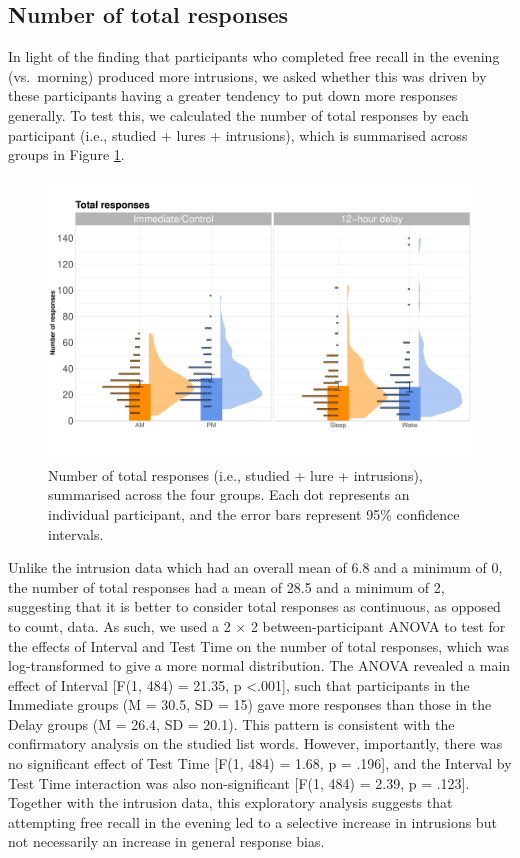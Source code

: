 \documentclass[
]{article}
\begin{document}
\hypertarget{number-of-total-responses}{%
\subsection{Number of total responses}\label{number-of-total-responses}}

In light of the finding that participants who completed free recall in the evening (vs.~morning) produced more intrusions, we asked whether this was driven by these participants having a greater tendency to put down more responses generally. To test this, we calculated the number of total responses by each participant (i.e., studied + lures + intrusions), which is summarised across groups in Figure \ref{fig:totalfig}.

\begin{figure}

{\centering \includegraphics{Figures/totalgraph} 

}

\caption{Number of total responses (i.e., studied + lure + intrusions), summarised across the four groups. Each dot represents an individual participant, and the error bars represent 95\% confidence intervals.}\label{fig:totalfig}
\end{figure}

Unlike the intrusion data which had an overall mean of 6.8 and a minimum of 0, the number of total responses had a mean of 28.5 and a minimum of 2, suggesting that it is better to consider total responses as continuous, as opposed to count, data. As such, we used a 2 \(\times\) 2 between-participant ANOVA to test for the effects of Interval and Test Time on the number of total responses, which was log-transformed to give a more normal distribution. The ANOVA revealed a main effect of Interval {[}F(1, 484) = 21.35, p \textless.001{]}, such that participants in the Immediate groups (M = 30.5, SD = 15) gave more responses than those in the Delay groups (M = 26.4, SD = 20.1). This pattern is consistent with the confirmatory analysis on the studied list words. However, importantly, there was no significant effect of Test Time {[}F(1, 484) = 1.68, p = .196{]}, and the Interval by Test Time interaction was also non-significant {[}F(1, 484) = 2.39, p = .123{]}. Together with the intrusion data, this exploratory analysis suggests that attempting free recall in the evening led to a selective increase in intrusions but not necessarily an increase in general response bias.
\end{document}
